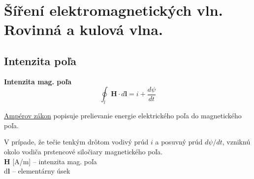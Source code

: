 \chapter{Šíření elektromagnetických vln. Rovinná a kulová vlna.}

\section{Intenzita poľa}

\noindent
\begin{minipage}[t]{0.48\textwidth}
	{\centering
	\textbf{Intenzita mag. poľa}
	\begin{equation}
		\oint_{l} \mathbf{H}\cdot d\mathbf{l} = i + \frac{d\psi}{dt}
		\label{Amper_zakon}
	\end{equation}}
	\raggedright
	\underline{Ampérov zákon} popisuje prelievanie energie elektrického poľa do magnetického poľa.\par
	\medskip
	V prípade, že tečie tenkým drôtom vodivý prúd $i$ a posuvný prúd $d\psi/dt$, vzniknú okolo vodiča prstencové siločiary magnetického poľa.\\
	\medskip
	$\mathbf{H}$ [A/m] -- intenzita mag. poľa\\ 
	d$\mathbf{l}$ -- elementárny úsek
	
\end{minipage}
